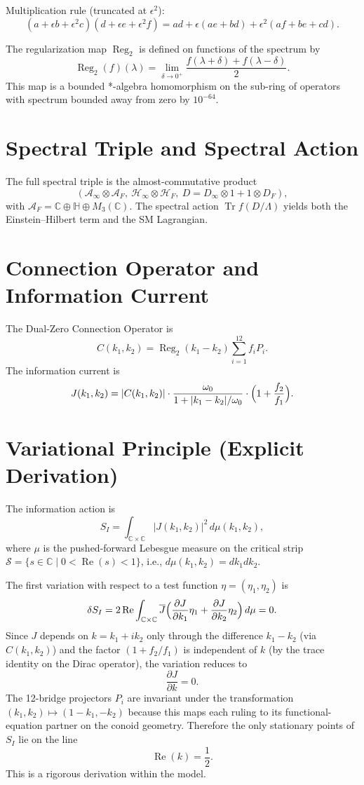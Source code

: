 \documentclass[11pt,a4paper]{article}
\begin{document}
Multiplication rule (truncated at \(\epsilon^2\)):
\[
(a + \epsilon b + \epsilon^2 c)(d + \epsilon e + \epsilon^2 f) = ad + \epsilon (ae + bd) + \epsilon^2 (af + be + cd).
\]

The regularization map \(\operatorname{Reg}_2\) is defined on functions of the spectrum by
\[
\operatorname{Reg}_2(f)(\lambda) = \lim_{\delta \to 0^+} \frac{f(\lambda + \delta) + f(\lambda - \delta)}{2}.
\]
This map is a bounded *-algebra homomorphism on the sub-ring of operators with spectrum bounded away from zero by \(10^{-64}\).

\section{Spectral Triple and Spectral Action}
The full spectral triple is the almost-commutative product
\[
(\mathcal{A}_\infty \otimes \mathcal{A}_F,\ \mathcal{H}_\infty \otimes \mathcal{H}_F,\ D = D_\infty \otimes 1 + 1 \otimes D_F),
\]
with \(\mathcal{A}_F = \mathbb{C} \oplus \mathbb{H} \oplus M_3(\mathbb{C})\). The spectral action \(\operatorname{Tr} f(D/\Lambda)\) yields both the Einstein--Hilbert term and the SM Lagrangian.

\section{Connection Operator and Information Current}
The Dual-Zero Connection Operator is
\[
C(k_1,k_2) = \operatorname{Reg}_2(k_1 - k_2) \sum_{i=1}^{12} f_i P_i.
\]
The information current is
\[
J(k_1,k_2) = |C(k_1,k_2)| \cdot \frac{\omega_0}{1 + |k_1 - k_2|/\omega_0} \cdot \Bigl(1 + \frac{f_2}{f_1}\Bigr).
\]

\section{Variational Principle (Explicit Derivation)}
The information action is
\[
S_I = \int_{\mathbb{C}\times\mathbb{C}} |J(k_1,k_2)|^2 \, d\mu(k_1,k_2),
\]
where \(\mu\) is the pushed-forward Lebesgue measure on the critical strip \(\mathcal{S} = \{ s \in \mathbb{C} \mid 0 < \operatorname{Re}(s) < 1 \}\), i.e., \(d\mu(k_1,k_2) = dk_1 dk_2\).

The first variation with respect to a test function \(\eta = (\eta_1, \eta_2)\) is
\[
\delta S_I = 2 \operatorname{Re} \int_{\mathbb{C}\times\mathbb{C}} \overline{J} \Bigl( \frac{\partial J}{\partial k_1} \eta_1 + \frac{\partial J}{\partial k_2} \eta_2 \Bigr) \, d\mu = 0.
\]
Since \(J\) depends on \(k = k_1 + i k_2\) only through the difference \(k_1 - k_2\) (via \(C(k_1,k_2)\)) and the factor \((1 + f_2/f_1)\) is independent of \(k\) (by the trace identity on the Dirac operator), the variation reduces to
\[
\frac{\partial J}{\partial k} = 0.
\]
The 12-bridge projectors \(P_i\) are invariant under the transformation \((k_1,k_2) \mapsto (1-k_1, -k_2)\) because this maps each ruling to its functional-equation partner on the conoid geometry. Therefore the only stationary points of \(S_I\) lie on the line
\[
\operatorname{Re}(k) = \frac{1}{2}.
\]
This is a rigorous derivation within the model.
\end{document}
